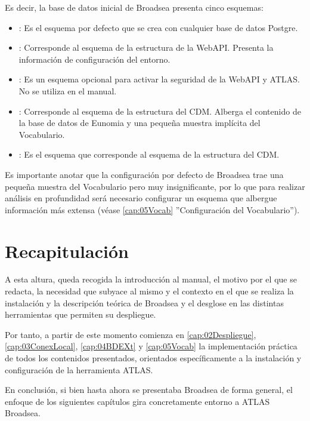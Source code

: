 Es decir, la base de datos inicial de Broadsea presenta cinco esquemas:

\begin{itemize}
    \item \textbf{}: Es el esquema por defecto que se crea con cualquier base de datos Postgre.
    \item \textbf{}: Corresponde al esquema  de la estructura de la WebAPI. Presenta la información de configuración del entorno.
    \item \textbf{}: Es un esquema opcional para activar la seguridad de la WebAPI y ATLAS. No se utiliza en el manual.
    \item \textbf{}: Corresponde al esquema  de la estructura del CDM. Alberga el contenido de la base de datos de Eunomia y una pequeña muestra implícita del Vocabulario.
    \item \textbf{}:  Es el esquema que corresponde al esquema  de la estructura del CDM.
\end{itemize}

Es importante anotar que la configuración por defecto de Broadsea trae una pequeña muestra del Vocabulario pero muy insignificante, por lo que para realizar análisis en profundidad será necesario configurar un esquema que albergue información más extensa (véase \ref{cap:05Vocab} ''Configuración del Vocabulario'').

\section{Recapitulación} \label{sec:01recap}

A esta altura, queda recogida la introducción al manual, el motivo por el que se redacta, la necesidad que subyace al mismo y el contexto en el que se realiza la instalación y la descripción teórica de Broadsea y el desglose en las distintas herramientas que permiten su despliegue.

Por tanto, a partir de este momento comienza en \ref{cap:02Despliegue}, \ref{cap:03ConexLocal}, \ref{cap:04BDEXt} y \ref{cap:05Vocab} la implementación práctica de todos los contenidos presentados, orientados específicamente a la instalación y configuración de la herramienta ATLAS. 

En conclusión, si bien hasta ahora se presentaba Broadsea de forma general, el enfoque de los siguientes capítulos gira concretamente entorno a ATLAS Broadsea.



